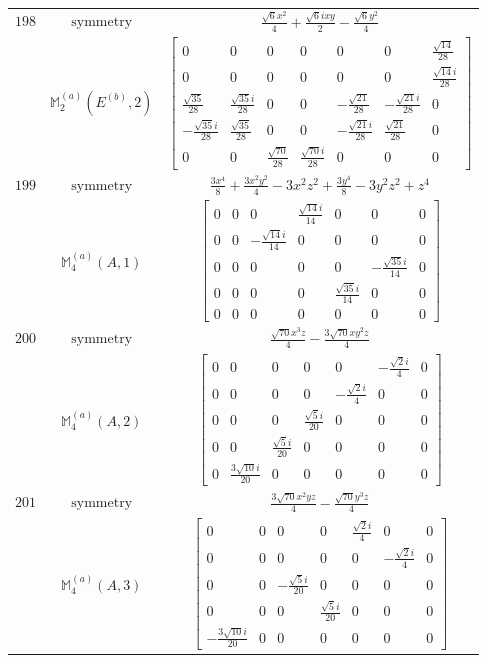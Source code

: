 \documentclass[fleqn,8pt,landscape]{jsarticle}
\begin{document}
\begin{longtable}{ccc}
$ 198 $ & $ \text{symmetry} $ & $ \frac{\sqrt{6} x^{2}}{4} + \frac{\sqrt{6} i x y}{2} - \frac{\sqrt{6} y^{2}}{4} $ \\
$  $ & $ \mathbb{M}_{2}^{(a)}(E^{(b)},2) $ & $ \begin{bmatrix} 0 & 0 & 0 & 0 & 0 & 0 & \frac{\sqrt{14}}{28} \\ 0 & 0 & 0 & 0 & 0 & 0 & \frac{\sqrt{14} i}{28} \\ \frac{\sqrt{35}}{28} & \frac{\sqrt{35} i}{28} & 0 & 0 & - \frac{\sqrt{21}}{28} & - \frac{\sqrt{21} i}{28} & 0 \\ - \frac{\sqrt{35} i}{28} & \frac{\sqrt{35}}{28} & 0 & 0 & - \frac{\sqrt{21} i}{28} & \frac{\sqrt{21}}{28} & 0 \\ 0 & 0 & \frac{\sqrt{70}}{28} & \frac{\sqrt{70} i}{28} & 0 & 0 & 0 \end{bmatrix} $ \\ \hline
$ 199 $ & $ \text{symmetry} $ & $ \frac{3 x^{4}}{8} + \frac{3 x^{2} y^{2}}{4} - 3 x^{2} z^{2} + \frac{3 y^{4}}{8} - 3 y^{2} z^{2} + z^{4} $ \\
$  $ & $ \mathbb{M}_{4}^{(a)}(A,1) $ & $ \begin{bmatrix} 0 & 0 & 0 & \frac{\sqrt{14} i}{14} & 0 & 0 & 0 \\ 0 & 0 & - \frac{\sqrt{14} i}{14} & 0 & 0 & 0 & 0 \\ 0 & 0 & 0 & 0 & 0 & - \frac{\sqrt{35} i}{14} & 0 \\ 0 & 0 & 0 & 0 & \frac{\sqrt{35} i}{14} & 0 & 0 \\ 0 & 0 & 0 & 0 & 0 & 0 & 0 \end{bmatrix} $ \\ \hline
$ 200 $ & $ \text{symmetry} $ & $ \frac{\sqrt{70} x^{3} z}{4} - \frac{3 \sqrt{70} x y^{2} z}{4} $ \\
$  $ & $ \mathbb{M}_{4}^{(a)}(A,2) $ & $ \begin{bmatrix} 0 & 0 & 0 & 0 & 0 & - \frac{\sqrt{2} i}{4} & 0 \\ 0 & 0 & 0 & 0 & - \frac{\sqrt{2} i}{4} & 0 & 0 \\ 0 & 0 & 0 & \frac{\sqrt{5} i}{20} & 0 & 0 & 0 \\ 0 & 0 & \frac{\sqrt{5} i}{20} & 0 & 0 & 0 & 0 \\ 0 & \frac{3 \sqrt{10} i}{20} & 0 & 0 & 0 & 0 & 0 \end{bmatrix} $ \\ \hline
$ 201 $ & $ \text{symmetry} $ & $ \frac{3 \sqrt{70} x^{2} y z}{4} - \frac{\sqrt{70} y^{3} z}{4} $ \\
$  $ & $ \mathbb{M}_{4}^{(a)}(A,3) $ & $ \begin{bmatrix} 0 & 0 & 0 & 0 & \frac{\sqrt{2} i}{4} & 0 & 0 \\ 0 & 0 & 0 & 0 & 0 & - \frac{\sqrt{2} i}{4} & 0 \\ 0 & 0 & - \frac{\sqrt{5} i}{20} & 0 & 0 & 0 & 0 \\ 0 & 0 & 0 & \frac{\sqrt{5} i}{20} & 0 & 0 & 0 \\ - \frac{3 \sqrt{10} i}{20} & 0 & 0 & 0 & 0 & 0 & 0 \end{bmatrix} $ \\ \hline

\end{longtable}
\end{document}
